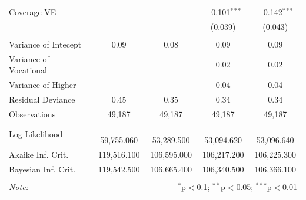 \documentclass[12pt,a4paper]{article}
\numberwithin{equation}{section}
\begin{document}
\begin{table}[!htbp]
\begin{tabular}{@{\extracolsep{5pt}}lcccc}
		Coverage VE &  &  & $-$0.101$^{***}$ & $-$0.142$^{***}$ \\ 
		&  &  & (0.039) & (0.043) \\ 
		& & & & \\ 
		\hline
		\hline
		Variance of Intecept & 0.09 & 0.08 & 0.09 & 0.09 \\ 
		Variance of Vocational &  &  & 0.02 & 0.02 \\ 
		Variance of Higher &  &  & 0.04 & 0.04 \\ 
		Residual Deviance & 0.45 & 0.35 & 0.34 & 0.34 \\ 
		\hline
		\hline
		Observations & 49,187 & 49,187 & 49,187 & 49,187 \\ 
		Log Likelihood & $-$59,755.060 & $-$53,289.500 & $-$53,094.620 & $-$53,096.640 \\ 
		Akaike Inf. Crit. & 119,516.100 & 106,595.000 & 106,217.200 & 106,225.300 \\ 
		Bayesian Inf. Crit. & 119,542.500 & 106,665.400 & 106,340.500 & 106,366.100 \\ 
		\hline 
		\hline \\[-1.8ex] 
		\textit{Note:}  & \multicolumn{4}{r}{$^{*}$p$<$0.1; $^{**}$p$<$0.05; $^{***}$p$<$0.01} \\ 
	\end{tabular} 
\end{table} 

\newpage
\end{document}
